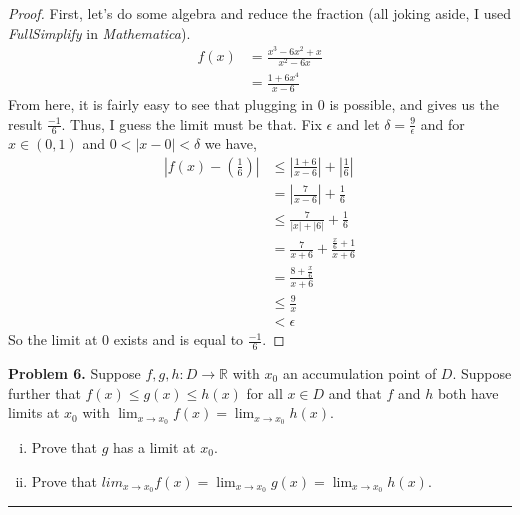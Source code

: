 \documentclass[leqno]{article}
\theoremstyle{nonumberplain}
\newtheorem{proof}{Proof}
\begin{document}
\begin{proof}
First, let's do some algebra and reduce the fraction (all joking aside, I used \emph{FullSimplify} in \emph{Mathematica}). 
\begin{align*}
f(x)&=\frac{x^3-6x^2+x}{x^2-6x}\\
&= \frac{1+6x^4}{x-6}
\end{align*} 
From here, it is fairly easy to see that plugging in $0$ is possible, and gives us the result $\frac{-1}{6}$.  Thus, I guess the limit must be that. Fix $\epsilon$ and let $\delta = \frac{9}{\epsilon}$ and for $x\in (0,1)$ and $0<|x-0|<\delta$ we have,
\begin{align*}
\left|f(x)-\left(\frac{1}{6}\right)\right| &\leq \left| \frac{1+6}{x-6}\right| + \left|\frac{1}{6}\right|\\
&=\left|\frac{7}{x-6}\right|+\frac{1}{6}\\
&\leq \frac{7}{|x|+|6|}+\frac{1}{6}\\
&= \frac{7}{x+6} + \frac{\frac{x}{6}+1}{x+6}\\
&= \frac{8+\frac{x}{6}}{x+6}\\
&\leq \frac{9}{x}\\
&<\epsilon
\end{align*}
So the limit at $0$ exists and is equal to $\frac{-1}{6}$.
\end{proof}


\pagebreak




\noindent\textbf{Problem 6.} Suppose $f,g,h \colon D \to \mathbb{R}$ with $x_0$ an accumulation point of $D$.  Suppose further that $f(x) \leq g(x) \leq h(x)$ for all $x\in D$ and that $f$ and $h$ both have limits at $x_0$ with $\lim_{x \to x_0} f(x) = \lim_{x \to x_0} h(x)$.

\begin{enumerate}[(i)]
\item
Prove that $g$ has a limit at $x_0$.
\item
Prove that $lim_{x \to x_0} f(x) = \lim_{x \to x_0} g(x)=\lim_{x \to x_0} h(x)$. 
\end{enumerate}

\noindent\rule[0.5ex]{\linewidth}{1pt}
\end{document}
